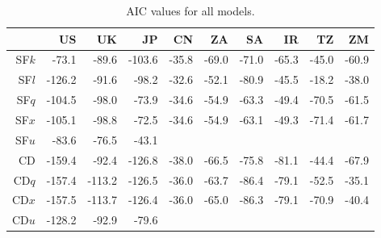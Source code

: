 \documentclass[preprint,authoryear,12pt]{elsarticle}\usepackage{graphicx, color}
\begin{document}
\begin{table}[H]
\begin{center}
\caption{AIC values for all models.}
\label{tab:AICTable}
{\tiny
\begin{tabular}{rrrrrrrrrr}
  \hline
 & US & UK & JP & CN & ZA & SA & IR & TZ & ZM \\ 
  \hline
SF$k$ & -73.1 & -89.6 & -103.6 & -35.8 & -69.0 & -71.0 & -65.3 & -45.0 & -60.9 \\ 
  SF$l$ & -126.2 & -91.6 & -98.2 & -32.6 & -52.1 & -80.9 & -45.5 & -18.2 & -38.0 \\ 
  SF$q$ & -104.5 & -98.0 & -73.9 & -34.6 & -54.9 & -63.3 & -49.4 & -70.5 & -61.5 \\ 
  SF$x$ & -105.1 & -98.8 & -72.5 & -34.6 & -54.9 & -63.1 & -49.3 & -71.4 & -61.7 \\ 
  SF$u$ & -83.6 & -76.5 & -43.1 &  &  &  &  &  &  \\ 
  CD & -159.4 & -92.4 & -126.8 & -38.0 & -66.5 & -75.8 & -81.1 & -44.4 & -67.9 \\ 
  CD$q$ & -157.4 & -113.2 & -126.5 & -36.0 & -63.7 & -86.4 & -79.1 & -52.5 & -35.1 \\ 
  CD$x$ & -157.5 & -113.7 & -126.4 & -36.0 & -65.0 & -86.3 & -79.1 & -70.9 & -40.4 \\ 
  CD$u$ & -128.2 & -92.9 & -79.6 &  &  &  &  &  &  \\ 
   \hline
\end{tabular}
}
\end{center}
\end{table}
\end{document}
